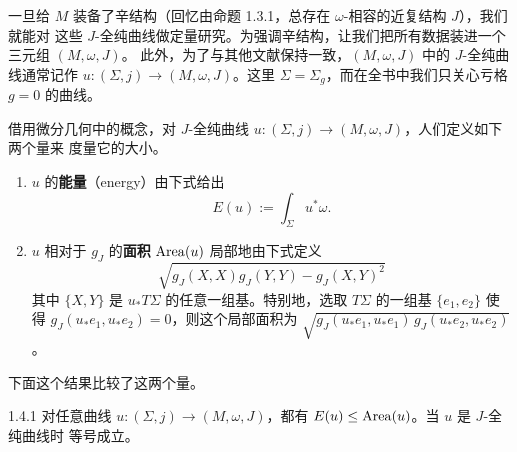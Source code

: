 
一旦给 $M$ 装备了辛结构（回忆由命题 1.3.1，总存在 $\omega$-相容的近复结构 $J$），我们就能对
这些 $J$-全纯曲线做定量研究。为强调辛结构，让我们把所有数据装进一个三元组 $(M,\omega,J)$。
此外，为了与其他文献保持一致，$(M,\omega,J)$ 中的 $J$-全纯曲线通常记作
$u:(\Sigma,j)\to(M,\omega,J)$。这里 $\Sigma=\Sigma_g$，而在全书中我们只关心亏格 $g=0$ 的曲线。

借用微分几何中的概念，对 $J$-全纯曲线 $u:(\Sigma,j)\to(M,\omega,J)$，人们定义如下两个量来
度量它的大小。
\begin{enumerate}[label=(\roman*)]
  \item $u$ 的\textbf{能量}（energy）由下式给出
    \begin{equation}
      E(u):=\int_\Sigma u^*\omega .
      \tag{1.9}
    \end{equation}
  \item $u$ 相对于 $g_J$ 的\textbf{面积} $\operatorname{Area}(u)$ 局部地由下式定义
    \begin{equation}
      \sqrt{g_J(X,X)g_J(Y,Y)-g_J(X,Y)^2}
      \tag{1.10}
    \end{equation}
    其中 $\{X,Y\}$ 是 $u_*T\Sigma$ 的任意一组基。特别地，选取 $T\Sigma$ 的一组基
    $\{e_1,e_2\}$ 使得 $g_J(u_*e_1,u_*e_2)=0$，则这个局部面积为
    $\sqrt{g_J(u_*e_1,u_*e_1)\,g_J(u_*e_2,u_*e_2)}$。
\end{enumerate}

下面这个结果比较了这两个量。

\begin{wprop}{1.4.1}
对任意曲线 $u:(\Sigma,j)\to(M,\omega,J)$，都有 $E(u)\le\operatorname{Area}(u)$。当 $u$ 是 $J$-全纯曲线时
等号成立。
\end{wprop}

